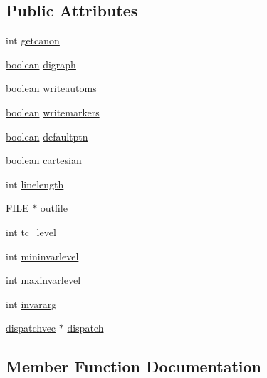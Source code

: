 \subsection*{Public Attributes}
\begin{DoxyCompactItemize}
\item 
int \mbox{\hyperlink{structoptionblk_aa27167e1870cb094a982790a9bcab8b9}{getcanon}}
\item 
\mbox{\hyperlink{nauty_8h_a621c38f1f10a1c565d897e3178b16d6e}{boolean}} \mbox{\hyperlink{structoptionblk_a366bffcf748d7588bebb2f67d7774dbd}{digraph}}
\item 
\mbox{\hyperlink{nauty_8h_a621c38f1f10a1c565d897e3178b16d6e}{boolean}} \mbox{\hyperlink{structoptionblk_ae62f3afc72cb10357a4db7d821e25d34}{writeautoms}}
\item 
\mbox{\hyperlink{nauty_8h_a621c38f1f10a1c565d897e3178b16d6e}{boolean}} \mbox{\hyperlink{structoptionblk_a4d502a0fedb648a1748971c782de26e5}{writemarkers}}
\item 
\mbox{\hyperlink{nauty_8h_a621c38f1f10a1c565d897e3178b16d6e}{boolean}} \mbox{\hyperlink{structoptionblk_a4e08adf2a3ae903fde6de3146c552f37}{defaultptn}}
\item 
\mbox{\hyperlink{nauty_8h_a621c38f1f10a1c565d897e3178b16d6e}{boolean}} \mbox{\hyperlink{structoptionblk_a231913380ed09b83f5428d22b4b1ece3}{cartesian}}
\item 
int \mbox{\hyperlink{structoptionblk_a818e970d4ff5007b295691d099479fe1}{linelength}}
\item 
F\+I\+LE $\ast$ \mbox{\hyperlink{structoptionblk_a480cd90dd68b09665734b61be4bee543}{outfile}}
\item 
int \mbox{\hyperlink{structoptionblk_a544beb8407bc4cc875d4aa05986741f6}{tc\+\_\+level}}
\item 
int \mbox{\hyperlink{structoptionblk_a3960890ec52ef8048e91aa02d8980d74}{mininvarlevel}}
\item 
int \mbox{\hyperlink{structoptionblk_a8e37cdce82bc815a1b618c022ce77a44}{maxinvarlevel}}
\item 
int \mbox{\hyperlink{structoptionblk_a9f69df3e681ec4ca4f15f49fa8d72cb6}{invararg}}
\item 
\mbox{\hyperlink{structdispatchvec}{dispatchvec}} $\ast$ \mbox{\hyperlink{structoptionblk_a6d825ceea4b8d2b34a4834d2693b985f}{dispatch}}
\end{DoxyCompactItemize}


\subsection{Member Function Documentation}
\mbox{\label{structoptionblk_a40fdcb235a8c4c4d3d595fbba271cc3e}} 
